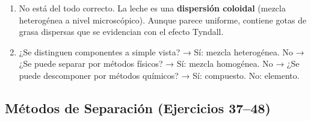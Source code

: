 \documentclass[12pt, a4paper]{article}
\begin{document}
\begin{enumerate}[leftmargin=*, label=\textbf{\arabic*.}]
  \item No está del todo correcto. La leche es una \textbf{dispersión coloidal} (mezcla heterogénea a nivel microscópico). Aunque parece uniforme, contiene gotas de grasa dispersas que se evidencian con el efecto Tyndall.

  \item ¿Se distinguen componentes a simple vista? → Sí: mezcla heterogénea. No → ¿Se puede separar por métodos físicos? → Sí: mezcla homogénea. No → ¿Se puede descomponer por métodos químicos? → Sí: compuesto. No: elemento.
\end{enumerate}

\subsection*{Métodos de Separación (Ejercicios 37--48)}
\end{document}
